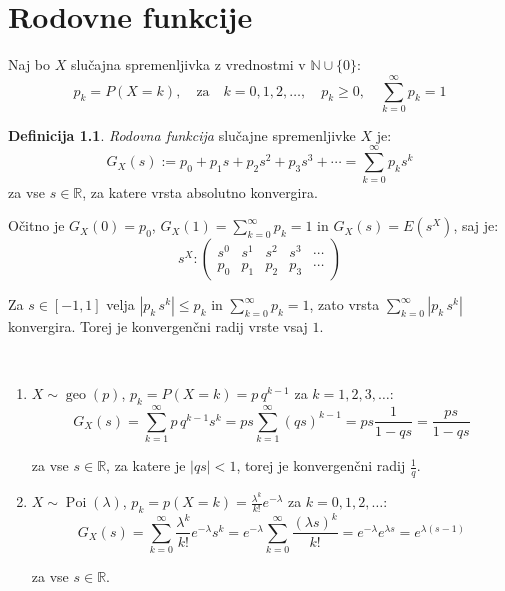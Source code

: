 \documentclass[12pt]{book}
\def\n{\noindent}
\theoremstyle{definition}
\newtheorem{definicija}{Definicija}
\theoremstyle{plain}
\theoremstyle{plain}
\theoremstyle{plain}
\theoremstyle{remark}
\begin{document}
\chapter{Rodovne funkcije}

\n Naj bo $X$ slučajna spremenljivka z vrednostmi v $\mathbb{N} \cup\{0\}$: 
$$
p_k=P(X=k), \quad \text{za} \quad k=0,1,2, \ldots, \quad p_k \geq 0, \quad \sum_{k=0}^{\infty} p_k=1
$$
\begin{definicija}
    \emph{Rodovna funkcija} slučajne spremenljivke $X$ je:
    $$
    G_X(s):=p_0+p_1 s+p_2 s^2+p_3 s^3+\cdots=\sum_{k=0}^{\infty} p_k s^k
    $$
    za vse $s \in \mathbb{R}$, za katere vrsta absolutno konvergira. 
\end{definicija}
    
\n Očitno je $G_X(0)=p_0$, $G_X(1)=\sum_{k=0}^{\infty} p_k=1$ in $G_X(s)=E\left( s^X\right)$, saj je: 
$$
s^X:\left(\begin{array}{ccccc}
    s^0 & s^1 & s^2 & s^3 & \cdots \\
    p_0 & p_1 & p_2 & p_3 & \cdots
    \end{array}\right)
$$

\n Za $s \in[-1,1]$ velja $\left|p_k \, s^k\right| \leq p_k$ in $\sum_{k=0}^{\infty} p_k=1$, zato vrsta $\sum_{k=0}^{\infty}\left|p_k \, s^k\right|$ konvergira. Torej je konvergenčni radij vrste vsaj $1$. 

\begin{zgled} ~

    \begin{enumerate}
        \item $X \sim \operatorname{geo}(p)$, $p_k=P(X=k)=p\, q^{k-1}$ za $k=1, 2, 3, \ldots$:
        $$
        G_X(s)=\sum_{k=1}^{\infty} p \, q^{k-1} s^k=p s \sum_{k=1}^{\infty}\left(qs\right)^{k-1} = p s \frac{1}{1-qs} = \frac{p s}{1-q s}
        $$

        za vse $s \in \mathbb{R}$, za katere je $|qs| < 1$, torej je konvergenčni radij $\frac{1}{q}$.
        \item $X \sim \operatorname{Poi}(\lambda)$, $p_k=p(X=k)=\frac{\lambda^k}{k !} e^{-\lambda}$ za $k=0,1,2, \ldots$:
        $$
        G_X(s)=\sum_{k=0}^{\infty} \frac{\lambda^k}{k !} e^{-\lambda} s^k=e^{-\lambda} \sum_{k=0}^{\infty}\frac{(\lambda s)^k}{k !}=e^{-\lambda} e^{\lambda s}=e^{\lambda(s-1)}
        $$

        za vse $s \in \mathbb{R}$.
    \end{enumerate}
\end{zgled}
\end{document}
